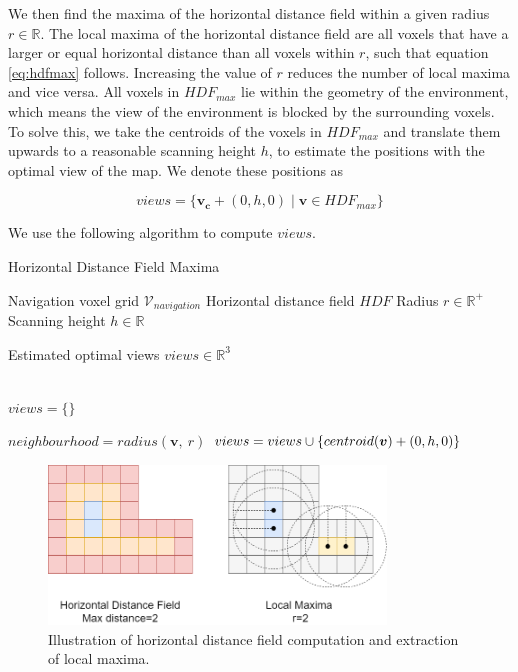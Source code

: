 We then find the maxima of the horizontal distance field within a given radius \(r \in \mathbb{R}\).  The local maxima of the horizontal distance field are all voxels that have a larger or equal horizontal distance than all voxels within \(r\), such that equation \ref{eq:hdfmax} follows. Increasing the value of \(r\) reduces the number of local maxima and vice versa. All voxels in \(HDF_{max}\) lie within the geometry of the environment, which means the view of the environment is blocked by the surrounding voxels. To solve this, we take the centroids of the voxels in \(HDF_{max}\) and translate them upwards to a reasonable scanning height \(h\), to estimate the positions with the optimal view of the map. We denote these positions as 

\begin{equation}
    \label{eq:views}
views = \{\boldsymbol{v_c} + (0, h, 0) \mid \boldsymbol{v} \in HDF_{max}\}
\end{equation}

We use the following algorithm to compute \(views\).

\begin{algorithm}
    \caption{Horizontal Distance Field Maxima}
    \begin{algorithmic}

    \Require \quad Navigation voxel grid \(\mathcal{V}_{navigation}\)
    \Require \quad Horizontal distance field \(HDF\)
    \Require \quad Radius \(r \in \mathbb{R}^+\)
    \Require \quad Scanning height \(h \in \mathbb{R}\)

    \Ensure \quad Estimated optimal views $views \in \mathbb{R}^3$

    \\

    \State $views = \{\}$

        \State \(neighbourhood = radius(\boldsymbol{v},\ r)\)
         
            \State $views = views \cup \{centroid(\boldsymbol{v}) + (0, h, 0)\}$
        \EndIf
    \EndFor
    
    \end{algorithmic}
\end{algorithm}

\begin{figure}[h]
    \centering
    \includegraphics*[width=0.8\textwidth]{./fig/hdf_simple.png}
    \caption{Illustration of horizontal distance field computation and extraction of local maxima.}
    \label{fig:hdf_simple}
\end{figure}

